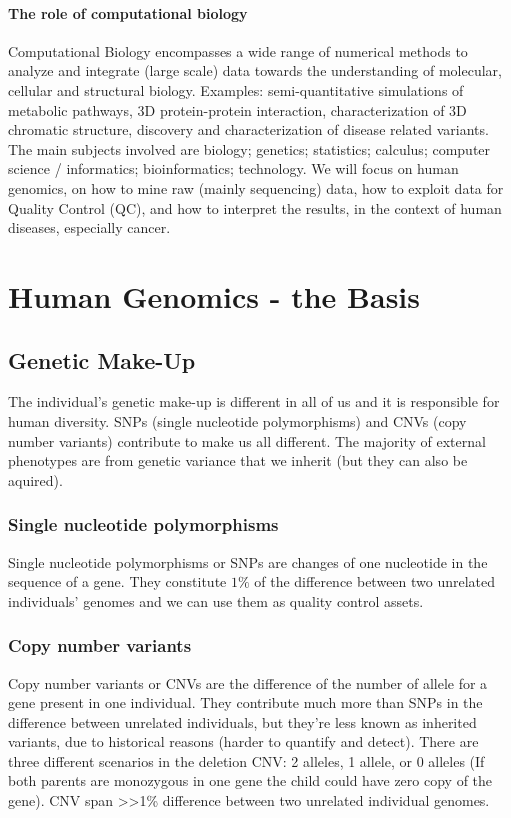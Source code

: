 	\paragraph*{The role of computational biology}
	Computational Biology encompasses a wide range of numerical methods to analyze and integrate (large scale) data towards the understanding of molecular, cellular and structural biology. Examples: semi-quantitative simulations of metabolic pathways, 3D protein-protein interaction, characterization of 3D chromatic structure, discovery and characterization of disease related variants. The main subjects involved are biology; genetics; statistics; calculus; computer science / informatics; bioinformatics; technology. 
We will focus on human genomics, on how to mine raw (mainly sequencing) data, how to exploit data for Quality Control (QC), and how to interpret the results, in the context of human diseases, especially cancer.

\section{Human Genomics - the Basis}
\subsection{Genetic Make-Up}
The individual's genetic make-up is different in all of us and it is responsible for human diversity.
SNPs (single nucleotide polymorphisms) and CNVs (copy number variants) contribute to make us all different. 
The majority of external phenotypes are from genetic variance that we inherit (but they can also be aquired). 

		\subsubsection{Single nucleotide polymorphisms}
		Single nucleotide polymorphisms or SNPs are changes of one nucleotide in the sequence of a gene.
		They constitute $1\%$ of the difference between two unrelated individuals' genomes and we can use them as quality control assets.

		\subsubsection{Copy number variants}
		Copy number variants or CNVs are the difference of the number of allele for a gene present in one individual.
		They contribute much more than SNPs in the difference between unrelated individuals, but they're less known as inherited variants, due to historical reasons (harder to quantify and detect).
		There are three different scenarios in the deletion CNV: 2 alleles, 1 allele, or 0 alleles (If both parents are monozygous in one gene the child could have zero copy of the gene).
		CNV span >>1\% difference between two unrelated individual genomes.

